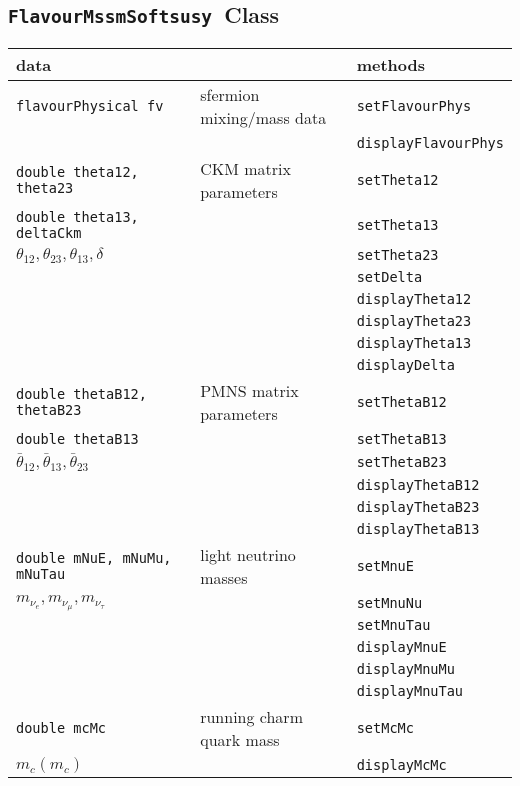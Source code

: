 \documentclass[]{article}
\def\code#1{\small{\tt #1}\normalsize}
\begin{document}
\subsection{\code{FlavourMssmSoftsusy}~Class \label{sec:flavour}}
\begin{table}\begin{center}\begin{tabular}{lll} 
data & & methods \\ \hline
\code{flavourPhysical fv}&sfermion mixing/mass data & \code{setFlavourPhys} \\
                        &                           &\code{displayFlavourPhys}\\ 
\hline
\code{double theta12, theta23} & CKM matrix parameters &
\code{setTheta12} \\
\code{double theta13, deltaCkm} & & \code{setTheta13} \\
$\theta_{12}, \theta_{23}, \theta_{13}, \delta$ & & \code{setTheta23} \\
 & & \code{setDelta} \\
 & & \code{displayTheta12} \\
 & & \code{displayTheta23} \\
 & & \code{displayTheta13} \\
 & & \code{displayDelta} \\
\hline
\code{double thetaB12, thetaB23} & PMNS matrix parameters &
\code{setThetaB12} \\
\code{double thetaB13} & & \code{setThetaB13} \\
${\bar \theta}_{12},{\bar \theta}_{13},{\bar \theta}_{23}$ & &
\code{setThetaB23} \\ 
 & & \code{displayThetaB12} \\
 & & \code{displayThetaB23} \\
 & & \code{displayThetaB13} \\
\hline
\code{double mNuE, mNuMu, mNuTau} & light neutrino masses& \code{setMnuE}\\
$m_{\nu_e}, m_{\nu_\mu}, m_{\nu_\tau}$ & & \code{setMnuNu} \\
 & & \code{setMnuTau} \\
 & & \code{displayMnuE} \\
 & & \code{displayMnuMu} \\
 & & \code{displayMnuTau} \\ \hline
\code{double mcMc} & running charm quark mass & \code{setMcMc} \\
$m_c(m_c)$ & & \code{displayMcMc} \\

\end{tabular}
\end{center}
\end{table}
\end{document}
